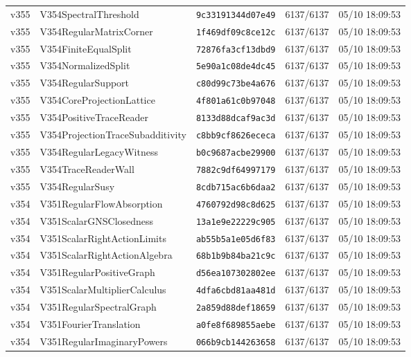 \documentclass[11pt]{article}
\theoremstyle{definition}\newtheorem{deriv}{Derivação}
\begin{document}
{\begin{longtable}{@{}lllll@{}}
v355 & V354SpectralThreshold & \texttt{9c33191344d07e49} & 6137/6137 & 05/10 18:09:53 \\
v355 & V354RegularMatrixCorner & \texttt{1f469df09c8ce12c} & 6137/6137 & 05/10 18:09:53 \\
v355 & V354FiniteEqualSplit & \texttt{72876fa3cf13dbd9} & 6137/6137 & 05/10 18:09:53 \\
v355 & V354NormalizedSplit & \texttt{5e90a1c08de4dc45} & 6137/6137 & 05/10 18:09:53 \\
v355 & V354RegularSupport & \texttt{c80d99c73be4a676} & 6137/6137 & 05/10 18:09:53 \\
v355 & V354CoreProjectionLattice & \texttt{4f801a61c0b97048} & 6137/6137 & 05/10 18:09:53 \\
v355 & V354PositiveTraceReader & \texttt{8133d88dcaf9ac3d} & 6137/6137 & 05/10 18:09:53 \\
v355 & V354ProjectionTraceSubadditivity & \texttt{c8bb9cf8626ececa} & 6137/6137 & 05/10 18:09:53 \\
v355 & V354RegularLegacyWitness & \texttt{b0c9687acbe29900} & 6137/6137 & 05/10 18:09:53 \\
v355 & V354TraceReaderWall & \texttt{7882c9df64997179} & 6137/6137 & 05/10 18:09:53 \\
v355 & V354RegularSusy & \texttt{8cdb715ac6b6daa2} & 6137/6137 & 05/10 18:09:53 \\
v354 & V351RegularFlowAbsorption & \texttt{4760792d98c8d625} & 6137/6137 & 05/10 18:09:53 \\
v354 & V351ScalarGNSClosedness & \texttt{13a1e9e22229c905} & 6137/6137 & 05/10 18:09:53 \\
v354 & V351ScalarRightActionLimits & \texttt{ab55b5a1e05d6f83} & 6137/6137 & 05/10 18:09:53 \\
v354 & V351ScalarRightActionAlgebra & \texttt{68b1b9b84ba21c9c} & 6137/6137 & 05/10 18:09:53 \\
v354 & V351RegularPositiveGraph & \texttt{d56ea107302802ee} & 6137/6137 & 05/10 18:09:53 \\
v354 & V351ScalarMultiplierCalculus & \texttt{4dfa6cbd81aa481d} & 6137/6137 & 05/10 18:09:53 \\
v354 & V351RegularSpectralGraph & \texttt{2a859d88def18659} & 6137/6137 & 05/10 18:09:53 \\
v354 & V351FourierTranslation & \texttt{a0fe8f689855aebe} & 6137/6137 & 05/10 18:09:53 \\
v354 & V351RegularImaginaryPowers & \texttt{066b9cb144263658} & 6137/6137 & 05/10 18:09:53 \\

\end{longtable}}
\end{document}
